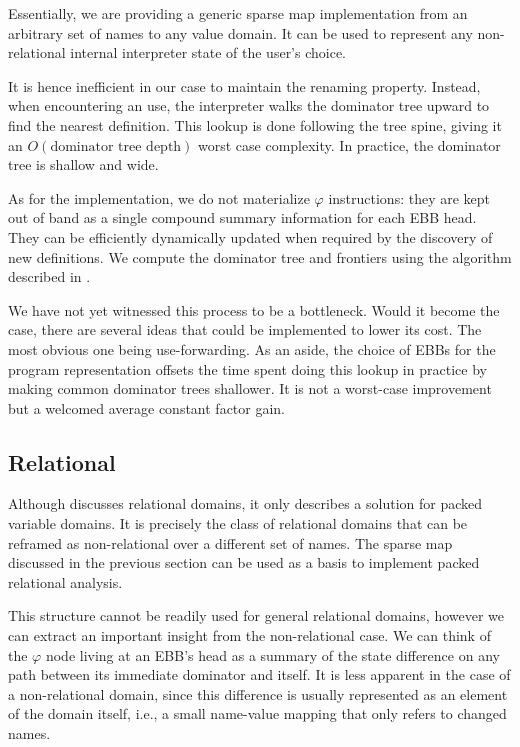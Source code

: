 \documentclass[11pt]{article}
\renewcommand{\phi}{\varphi}
\begin{document}
Essentially, we are providing a generic sparse map implementation from an arbitrary set of names to any value domain.
It can be used to represent any non-relational internal interpreter state of the user's choice.

It is hence inefficient in our case to maintain the renaming property. Instead, when encountering an use, the interpreter walks the dominator tree upward to find the nearest definition.
This lookup is done following the tree spine, giving it an $O(\text{dominator tree depth})$ worst case complexity. In practice, the dominator tree is shallow and wide.

As for the implementation, we do not materialize $\phi$ instructions: they are kept out of band as a single compound summary information for each EBB head.
They can be efficiently dynamically updated when required by the discovery of new definitions.
We compute the dominator tree and frontiers using the algorithm described in \cite{domtree}.

We have not yet witnessed this process to be a bottleneck. Would it become the case, there are several ideas that could be implemented to lower its cost. The most obvious one being use-forwarding.
As an aside, the choice of EBBs for the program representation offsets the time spent doing this lookup in practice by making common dominator trees shallower.
It is not a worst-case improvement but a welcomed average constant factor gain.


\subsection*{Relational}
Although \cite{sparse-nr} discusses relational domains, it only describes a solution for packed variable domains.
It is precisely the class of relational domains that can be reframed as non-relational over a different set of names.
The sparse map discussed in the previous section can be used as a basis to implement packed relational analysis.

This structure cannot be readily used for general relational domains, however we can extract an important insight from the non-relational case. We can think of the $\phi$ node living at an EBB's head as a summary of the state difference on any path between its immediate dominator and itself. It is less apparent in the case of a non-relational domain, since this difference is usually represented as an element of the domain itself, i.e., a small name-value mapping that only refers to changed names.
\end{document}
